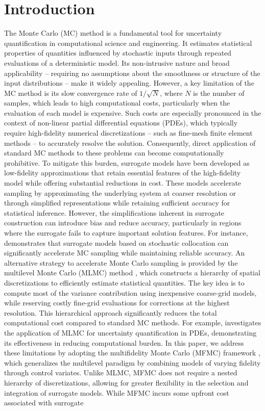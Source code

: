 \section{Introduction}\label{sec:intro}
The Monte Carlo (MC) method is a fundamental tool for uncertainty quantification in computational science and engineering. It estimates statistical properties of quantities influenced by stochastic inputs through repeated evaluations of a deterministic model. Its non-intrusive nature and broad applicability -- requiring no assumptions about the smoothness or structure of the input distributions -- make it widely appealing. However, a key limitation of the MC method is its slow convergence rate of $1/\sqrt{N}$, where $N$ is the number of samples, which leads to high computational costs, particularly when the evaluation of each model is expensive. Such costs are especially pronounced in the context of non-linear partial differential equations (PDEs), which typically require high-fidelity numerical discretizations -- such as fine-mesh finite element methods -- to accurately resolve the solution. Consequently, direct application of standard MC methods to these problems can become computationally prohibitive. To mitigate this burden, surrogate models have been developed as low-fidelity approximations that retain essential features of the high-fidelity model while offering substantial reductions in cost. These models accelerate sampling by approximating the underlying system at coarser resolution or through simplified representations while retaining sufficient accuracy for statistical inference. However, the simplifications inherent in surrogate construction can introduce bias and reduce accuracy, particularly in regions where the surrogate fails to capture important solution features. For instance, \cite{ElLiSa:2022} demonstrates that surrogate models based on stochastic collocation can significantly accelerate MC sampling while maintaining reliable accuracy. An alternative strategy to accelerate Monte Carlo sampling is provided by the multilevel Monte Carlo (MLMC) method \cite{BaScZo:2011,Gi:2008,Gi:2015}, which constructs a hierarchy of spatial discretizations to efficiently estimate statistical quantities. The key idea is to compute most of the variance contribution using inexpensive coarse-grid models, while reserving costly fine-grid evaluations for corrections at the highest resolution. This hierarchical approach significantly reduces the total computational cost compared to standard MC methods. For example, \cite{ElLiSa:2023} investigates the application of MLMC for uncertainty quantification in PDEs, demonstrating its effectiveness in reducing computational burden. In this paper, we address these limitations by adopting the multifidelity Monte Carlo (MFMC) framework \cite{PeGuWi:2018,PeWiGu:2016,PeGuWi:2018}, which generalizes the multilevel paradigm by combining models of varying fidelity through control variates. Unlike MLMC, MFMC does not require a nested hierarchy of discretizations, allowing for greater flexibility in the selection and integration of surrogate models. While MFMC incurs some upfront cost associated with surrogate 